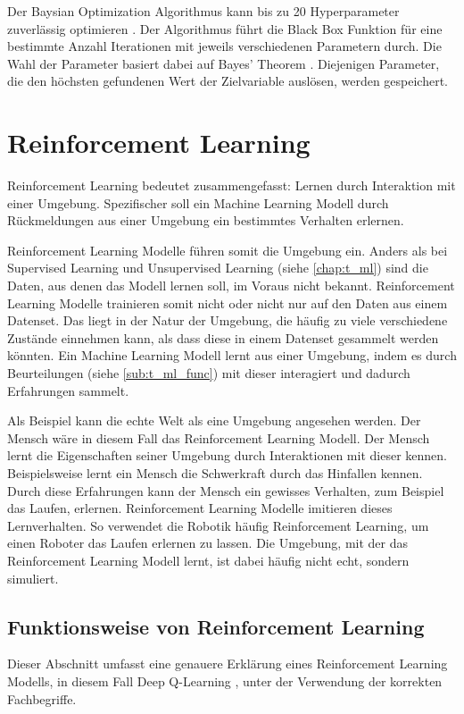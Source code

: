 Der Baysian Optimization Algorithmus kann bis zu 20 Hyperparameter zuverlässig
optimieren \cite{moriconi_high-dimensional_2020}. Der Algorithmus führt die
Black Box Funktion für eine bestimmte Anzahl Iterationen mit jeweils
verschiedenen Parametern durch. Die Wahl der Parameter basiert dabei auf Bayes'
Theorem \cite[S. 7]{garnett_bayesian_2022}. Diejenigen Parameter, die den
höchsten gefundenen Wert der Zielvariable auslösen, werden gespeichert.
 
 
\section{Reinforcement Learning}\label{chap:t_rl} Reinforcement Learning
bedeutet zusammengefasst: Lernen durch Interaktion mit einer Umgebung.
Spezifischer soll ein Machine Learning Modell durch Rückmeldungen aus einer
Umgebung ein bestimmtes Verhalten erlernen.
 
Reinforcement Learning Modelle führen somit die Umgebung ein. Anders als bei
Supervised Learning und Unsupervised Learning (siehe \ref{chap:t_ml}) sind
die Daten, aus denen das Modell lernen soll, im Voraus nicht bekannt.
Reinforcement Learning Modelle trainieren somit nicht oder nicht nur auf den
Daten aus einem Datenset. Das liegt in der Natur der Umgebung, die häufig zu
viele verschiedene Zustände einnehmen kann, als dass diese in einem Datenset
gesammelt werden könnten. Ein Machine Learning Modell lernt aus einer Umgebung,
indem es durch Beurteilungen (siehe \ref{sub:t_ml_func}) mit dieser
interagiert und dadurch Erfahrungen sammelt.
\cite{verma_what_2021}
 
Als Beispiel kann die echte Welt als eine Umgebung angesehen werden. Der Mensch
wäre in diesem Fall das Reinforcement Learning Modell. Der Mensch lernt die
Eigenschaften seiner Umgebung durch Interaktionen mit dieser kennen.
Beispielsweise lernt ein Mensch die Schwerkraft durch das Hinfallen kennen.
Durch diese Erfahrungen kann der Mensch ein gewisses Verhalten, zum Beispiel das
Laufen, erlernen. Reinforcement Learning Modelle imitieren dieses Lernverhalten.
So verwendet die Robotik häufig Reinforcement Learning, um einen Roboter das
Laufen erlernen zu lassen. Die Umgebung, mit der das Reinforcement Learning
Modell lernt, ist dabei häufig nicht echt, sondern simuliert.
 
\subsection{Funktionsweise von Reinforcement Learning}\label{sub:t_rl_func}
Dieser Abschnitt umfasst eine genauere Erklärung eines Reinforcement Learning
Modells, in diesem Fall Deep Q-Learning \cite{mnih_playing_2013}, unter der
Verwendung der korrekten Fachbegriffe.
 
